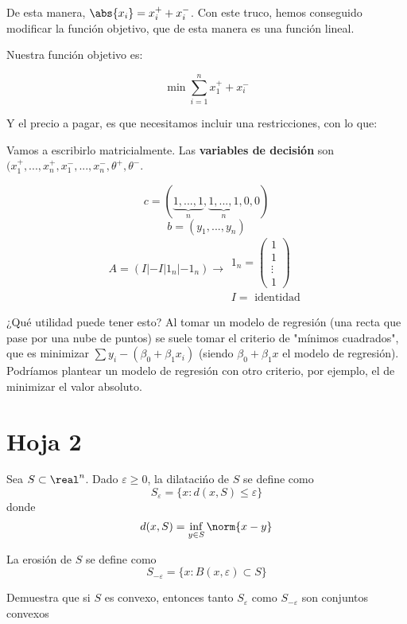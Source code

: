 \begin{problem}[9]
De esta manera, $\abs{x_i} = x_i^+ + x_i^-$.
%
Con este truco, hemos conseguido modificar la función objetivo, que de esta manera es una función lineal.

Nuestra función objetivo es:

\[\min \sum_{i=1}^n x_1^+ + x_i^-\]

Y el precio a pagar, es que necesitamos incluir una restricciones, con lo que:


\begin{ioprob}
\goal{\[\min \sum_{i=1}^n x_1^+ + x_i^-\]}
\end{ioprob}


Vamos a escribirlo matricialmente.
Las \textbf{variables de decisión} son $(x_1^+,...,x_n^+,x_1^-,...,x_n^-,\theta^+,\theta^-$.

\[c = (\underbrace{1,...,1}_{n},\underbrace{1,...,1}_{n},0,0)\]
\[b = (y_1,...,y_n) \]
\[A = \left( I | -I | 1_n | -1_n\right)\to \begin{array}{c}1_n = \begin{pmatrix}1\\1\\\vdots\\1\end{pmatrix}\\ I = \text{ identidad} \end{array}\]




\obs{}
¿Qué utilidad puede tener esto?
Al tomar un modelo de regresión (una recta que pase por una nube de puntos) se suele tomar el criterio de "mínimos cuadrados", que es minimizar $\sum y_i-(β_0+β_1x_i)$ (siendo $β_0+β_1x$ el modelo de regresión).
Podríamos plantear un modelo de regresión con otro criterio, por ejemplo, el de minimizar el valor absoluto.




\end{problem}



\section{Hoja 2}
\begin{problem}[1]
Sea $S\subset \real^n$.
%
Dado $ε\geq 0$, la dilatacińo de $S$ se define como \[S_ε = \{x:d(x,S)\leq ε\}\] donde \[d(x,S) = \inf_{y\in S}{\norm{x-y}}\]

La erosión de $S$ se define como
\[S_{-ε} = \{x:B(x,ε) \subset S \} \]

Demuestra que si $S$ es convexo, entonces tanto $S_{ε}$ como $S_{-ε}$ son conjuntos convexos

\solution
{}

\end{problem}


